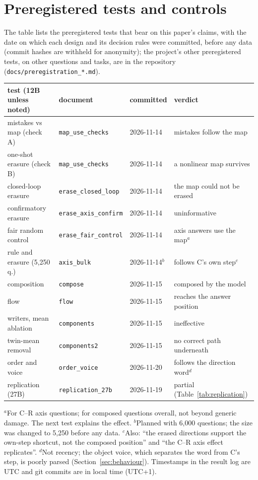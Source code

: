 \documentclass{article}
\begin{document}



\appendix
\section{Preregistered tests and controls}\label{app:prereg}
The table lists the preregistered tests that bear on this paper's claims, with the date on which each design and its
decision rules were committed, before any data (commit hashes are withheld for anonymity); the project's other preregistered tests, on other questions and tasks, are in the
repository (\texttt{docs/preregistration\_*.md}).

\begin{center}
\footnotesize
\begin{tabular}{@{}llll@{}}
  \toprule
  test (12B unless noted) & document & committed & verdict \\
  \midrule
  mistakes vs map (check A) & \texttt{map\_use\_checks} & 2026-11-14 & mistakes follow the map \\
  one-shot erasure (check B) & \texttt{map\_use\_checks} & 2026-11-14 & a nonlinear map survives \\
  closed-loop erasure & \texttt{erase\_closed\_loop} & 2026-11-14 & the map could not be erased \\
  confirmatory erasure & \texttt{erase\_axis\_confirm} & 2026-11-14 & uninformative \\
  fair random control & \texttt{erase\_fair\_control} & 2026-11-14 & axis answers use the map$^{a}$ \\
  rule and erasure (5,250 q.) & \texttt{axis\_bulk} & 2026-11-14$^{b}$ & follows C's own step$^{c}$ \\
  composition & \texttt{compose} & 2026-11-15 & composed by the model \\
  flow & \texttt{flow} & 2026-11-15 & reaches the answer position \\
  writers, mean ablation & \texttt{components} & 2026-11-15 & ineffective \\
  twin-mean removal & \texttt{components2} & 2026-11-15 & no correct path underneath \\
  order and voice & \texttt{order\_voice} & 2026-11-20 & follows the direction word$^{d}$ \\
  replication (27B) & \texttt{replication\_27b} & 2026-11-19 & partial (Table~\ref{tab:replication}) \\
  \bottomrule
\end{tabular}

\raggedright
$^{a}$For C--R axis questions; for composed questions overall, not beyond generic damage. The next test explains the
effect. $^{b}$Planned with 6,000 questions; the size was changed to 5,250 before any data. $^{c}$Also:
``the erased directions support the own-step shortcut, not the composed position'' and ``the C--R axis effect
replicates''. $^{d}$Not recency; the object voice, which separates the word from C's step, is poorly parsed (Section~\ref{sec:behaviour}). Timestamps in the result log are UTC and git commits are in local time (UTC+1).
\end{center}
\end{document}

